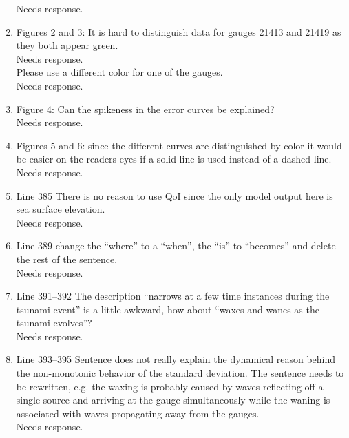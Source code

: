 \documentclass[]{article}
\newcommand{\alert}[1]{{\color{red} #1}}
\begin{document}
\begin{enumerate}
\alert{Needs response.} \\

\item Figures 2 and 3: It is hard to distinguish data for gauges 21413 and 21419 as they both appear green. \\

\alert{Needs response.} \\

Please use a different color for one of the gauges. \\

\alert{Needs response.} \\

\item Figure 4: Can the spikeness in the error curves be explained? \\

\alert{Needs response.} \\

\item Figures 5 and 6: since the different curves are distinguished by color it would be easier on the readers eyes if a solid line is used instead of a dashed line. \\

\alert{Needs response.} \\

\item Line 385 There is no reason to use QoI since the only model output here is sea surface elevation.\\

\alert{Needs response.} \\

\item Line 389 change the ``where'' to a ``when'', the ``is'' to ``becomes'' and delete the rest of the sentence.\\

\alert{Needs response.} \\

\item Line 391–392 The description ``narrows at a few time instances during the tsunami event'' is a little awkward, how about ``waxes and wanes as the tsunami evolves''?\\

\alert{Needs response.} \\

\item Line 393–395 Sentence does not really explain the dynamical reason behind the non-monotonic behavior of the standard deviation. The sentence needs to be rewritten, e.g. the waxing is probably caused by waves reflecting off a single source and arriving at the gauge simultaneously while the waning is associated with waves propagating away from the gauges.\\

\alert{Needs response.}

\end{enumerate}
\end{document}
